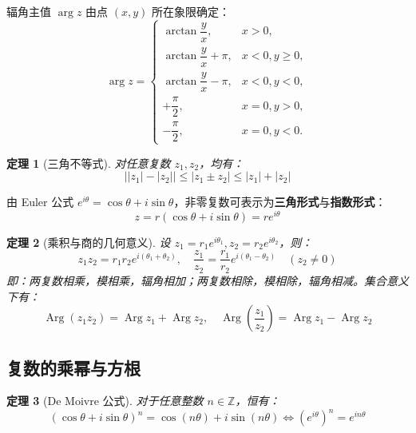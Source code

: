 \documentclass[11pt,a4paper,fontset=fandol]{ctexart}
\newtheorem{theorem}{定理}[section]
\theoremstyle{remark}
\begin{document}
辐角主值 $\arg z$ 由点 $(x, y)$ 所在象限确定：
\begin{equation}
    \arg z = \begin{cases}
        \arctan \dfrac{y}{x}, & x > 0, \\
        \arctan \dfrac{y}{x} + \pi, & x < 0, y \ge 0, \\
        \arctan \dfrac{y}{x} - \pi, & x < 0, y < 0, \\
        +\dfrac{\pi}{2}, & x = 0, y > 0, \\
        -\dfrac{\pi}{2}, & x = 0, y < 0.
    \end{cases}
\end{equation}

\begin{theorem}[三角不等式]
对任意复数 $z_1, z_2$，均有：
\begin{equation}
    \big| |z_1| - |z_2| \big| \le |z_1 \pm z_2| \le |z_1| + |z_2|
\end{equation}
\end{theorem}

由 Euler 公式 $e^{i\theta} = \cos\theta + i\sin\theta$，非零复数可表示为\textbf{三角形式}与\textbf{指数形式}：
\begin{equation}
    z = r(\cos\theta + i\sin\theta) = r e^{i\theta}
\end{equation}

\begin{theorem}[乘积与商的几何意义]
设 $z_1 = r_1 e^{i\theta_1}, z_2 = r_2 e^{i\theta_2}$，则：
\begin{equation}
    z_1 z_2 = r_1 r_2 e^{i(\theta_1 + \theta_2)}, \quad
    \frac{z_1}{z_2} = \frac{r_1}{r_2} e^{i(\theta_1 - \theta_2)} \quad (z_2 \neq 0)
\end{equation}
即：两复数相乘，模相乘，辐角相加；两复数相除，模相除，辐角相减。集合意义下有：
\begin{equation}
    \operatorname{Arg}(z_1 z_2) = \operatorname{Arg} z_1 + \operatorname{Arg} z_2, \quad
    \operatorname{Arg}\left(\frac{z_1}{z_2}\right) = \operatorname{Arg} z_1 - \operatorname{Arg} z_2
\end{equation}
\end{theorem}

\subsection{复数的乘幂与方根}

\begin{theorem}[De Moivre 公式]
对于任意整数 $n \in \mathbb{Z}$，恒有：
\begin{equation}
    (\cos\theta + i\sin\theta)^n = \cos(n\theta) + i\sin(n\theta) \iff (e^{i\theta})^n = e^{in\theta}
\end{equation}
\end{theorem}
\end{document}
